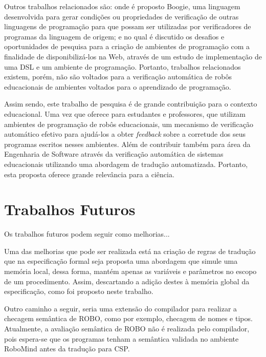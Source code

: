 Outros trabalhos relacionados são: \cite{this-is-boogie-2-2} onde é proposto Boogie, uma linguagem desenvolvida para gerar condições ou propriedades de verificação de outras linguagens de programação para que possam ser utilizadas por verificadores de programas da linguagem de origem; e \cite{Kats} no qual é discutido os desafios e oportunidades de pesquisa para a criação de ambientes de programação com a finalidade de disponibilizá-los na Web, através de um estudo de implementação de uma DSL e um ambiente de programação. Portanto, trabalhos relacionados existem, porém, não são voltados para a verificação automática de robôs educacionais de ambientes voltados para o aprendizado de programação.

Assim sendo, este trabalho de pesquisa é de grande contribuição para o contexto educacional. Uma vez que oferece para estudantes e professores, que utilizam ambientes de programação de robôs educacionais, um mecanismo de verificação automático efetivo para ajudá-los a obter \textit{feedback} sobre a corretude dos seus programas escritos nesses ambientes. Além de contribuir também para área da Engenharia de Software através da verificação automática de sistemas educacionais utilizando uma abordagem de tradução automatizada. Portanto, esta proposta oferece grande relevância para a ciência.


\section{Trabalhos Futuros}

Os trabalhos futuros podem seguir como melhorias... 

Uma das melhorias que pode ser realizada está na criação de regras de tradução que na especificação formal seja proposta uma abordagem que simule uma memória local, dessa forma, mantém apenas as variáveis e parâmetros no escopo de um procedimento. Assim, descartando a adição destes à memória global da especificação, como foi proposto neste trabalho.

Outro caminho a seguir, seria uma extensão do compilador para realizar a checagem semântica de ROBO, como por exemplo, checagem de nomes e tipos. Atualmente, a avaliação semântica de ROBO não é realizada pelo compilador, pois espera-se que os programas tenham a semântica validada no ambiente RoboMind antes da tradução para CSP.